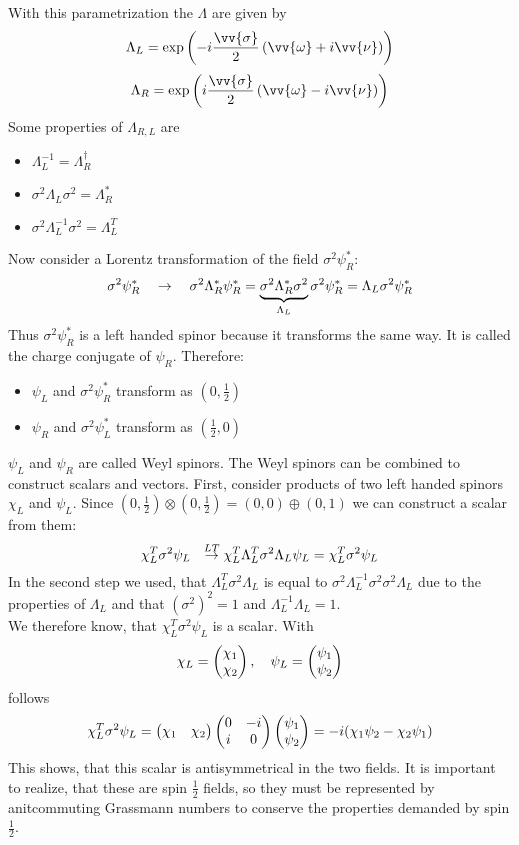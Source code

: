 With this parametrization the $\Lambda$ are given by
\[ \Lambda_L = \exp\left( -i \frac{\vv{\sigma}}{2} \left(\vv{\omega} + i \vv{\nu}\right)\right)\]
\[ \Lambda_R = \exp\left( i \frac{\vv{\sigma}}{2} \left( \vv{\omega} - i \vv{\nu}\right)\right)\]
Some properties of $\Lambda_{R,L}$ are
\begin{itemize}
\item $\Lambda_L^{-1} = \Lambda_R^\dagger$
\item $\sigma^2 \Lambda_L \sigma^2 = \Lambda_R^*$
\item $\sigma^2 \Lambda_L^{-1} \sigma^2 = \Lambda_L^T$
\end{itemize}
Now consider a Lorentz transformation of the field $\sigma^2 \psi_R^*$:
\[ \sigma^2 \psi_R^* ~~~\rightarrow~~~ \sigma^2 \Lambda_R^*\psi_R^* = \underbrace{\sigma^2 \Lambda_R^*\sigma^2}_{\Lambda_L} \sigma^2 \psi_R^* = \Lambda_L \sigma^2 \psi_R^*\]
Thus $\sigma^2 \psi_R^*$ is a left handed spinor because it transforms the same way. It is called the charge conjugate of $\psi_R$. Therefore:
\begin{itemize}
\item $\psi_L$ and $\sigma^2\psi_R^*$ transform as $\left(0, \frac{1}{2}\right)$
\item $\psi_R$ and $\sigma^2\psi_L^*$ transform as $\left(\frac{1}{2}, 0\right)$
\end{itemize}
$\psi_L$ and $\psi_R$ are called Weyl spinors.
The Weyl spinors can be combined to construct scalars and vectors. First, consider products of two left handed spinors $\chi_L$ and $\psi_L$. Since $\left( 0, \frac{1}{2}\right) \otimes \left( 0, \frac{1}{2}\right) = (0,0) \oplus (0,1)$ we can construct a scalar from them:
\[ \chi_L^T \sigma^2 \psi_L ~~\overset{LT}{\rightarrow} \chi_L^T \Lambda_L^T \sigma^2 \Lambda_L \psi_L = \chi_L^T \sigma^2 \psi_L\]
In the second step we used, that $\Lambda_L^T \sigma^2 \Lambda_L$ is equal to $\sigma^2 \Lambda_L^{-1}\sigma^2\sigma^2 \Lambda_L$ due to the properties of $\Lambda_{L}$ and that $(\sigma^2)^2= 1$ and $\Lambda_L^{-1}\Lambda_L = 1$. \\
We therefore know, that $\chi^T_L\sigma^2\psi_L$ is a scalar. With
\[ \chi_L = \begin{pmatrix} \chi_1 \\ \chi_2 \end{pmatrix}, ~~~ \psi_L = \begin{pmatrix} \psi_1 \\ \psi_2 \end{pmatrix}\]
follows
\[ \chi_L^T \sigma^2 \psi_L = \begin{pmatrix} \chi_1 & \chi_2\end{pmatrix} \begin{pmatrix}0&-i\\i&0\end{pmatrix} \begin{pmatrix} \psi_1 \\ \psi_2 \end{pmatrix} = - i (\chi_1 \psi_2 - \chi_2 \psi_1)\]
This shows, that this scalar is antisymmetrical in the two fields. It is important to realize, that these are spin $\frac{1}{2}$ fields, so they must be represented by anitcommuting Grassmann numbers to conserve the properties demanded by spin $\frac{1}{2}$.\\
